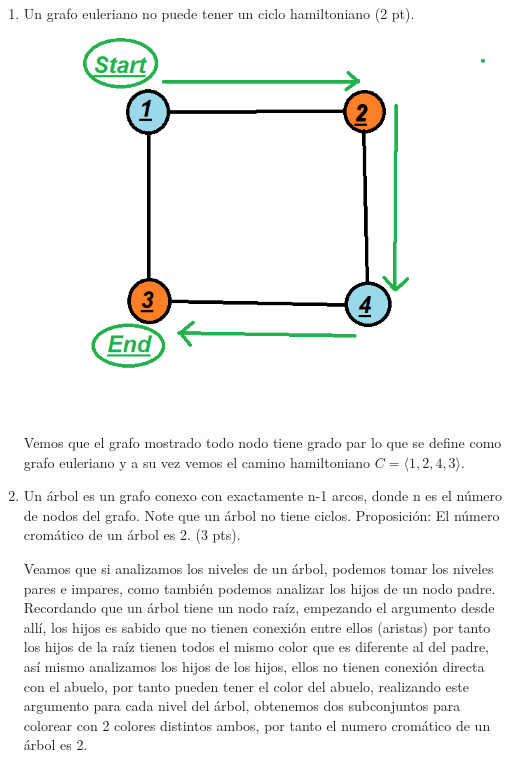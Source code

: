 \documentclass[a4paper,12pt]{article}
\begin{document}
\begin{enumerate}

\item Un grafo euleriano no puede tener un ciclo hamiltoniano (2 pt).

\begin{flushleft}

\begin{center}
\par \includegraphics[scale=0.8]{p5} \par
\end{center}

Vemos que el grafo mostrado todo nodo tiene grado par lo que se define como grafo euleriano y a su vez vemos el camino hamiltoniano $C = \langle 1,2,4,3 \rangle$.

\end{flushleft}

\item Un árbol es un grafo conexo con exactamente n-1 arcos, donde n es el número de nodos del grafo. Note que un árbol no tiene ciclos.
Proposición: El número cromático de un árbol es 2. (3 pts).

\begin{flushleft}
Veamos que si analizamos los niveles de un árbol, podemos tomar los niveles pares e impares, como también podemos analizar los hijos de un nodo padre. Recordando que un árbol tiene un nodo raíz, empezando el argumento desde allí, los hijos es sabido que no tienen conexión entre ellos (aristas) por tanto los hijos de la raíz tienen todos el mismo color que es diferente al del padre, así mismo analizamos los hijos de los hijos, ellos no tienen conexión directa con el abuelo, por tanto pueden tener el color del abuelo, realizando este argumento para cada nivel del árbol, obtenemos dos subconjuntos para colorear con 2 colores distintos ambos, por tanto el numero cromático de un árbol es 2.
\end{flushleft}


\end{enumerate}
\end{document}
